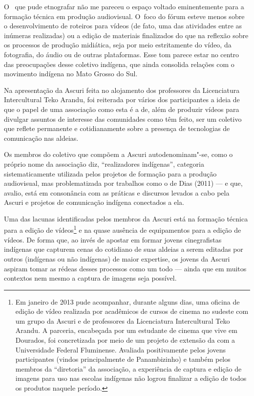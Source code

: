 O~ que pude etnografar não me pareceu o espaço voltado eminentemente
para a formação técnica em produção audiovisual. O~foco do fórum esteve
menos sobre o desenvolvimento de roteiros para vídeos (de fato, uma das
atividades entre as inúmeras realizadas) ou a edição de materiais
finalizados do que na reflexão sobre os processos de produção
midiática, seja por meio estritamente do vídeo, da fotografia, do áudio
ou de outras plataformas. Esse tom parece estar no centro das
preocupações desse coletivo indígena, que ainda consolida relações com
o movimento indígena no Mato Grosso do Sul.

Na apresentação da Ascuri feita no alojamento dos professores da
Licenciatura Intercultural Teko Arandu, foi reiterada por vários dos
participantes a ideia de que o papel de uma associação como esta é a
de, além de produzir vídeos para divulgar assuntos de interesse das
comunidades como têm feito, ser um coletivo que reflete permanente e cotidianamente
sobre a presença de tecnologias de comunicação nas aldeias.

Os membros do coletivo que compõem a Ascuri autodenominam"-se, como o
próprio nome da associação diz, ``realizadores indígenas'', categoria
sistematicamente utilizada pelos projetos de formação para a produção
audiovisual, mas problematizada por trabalhos como o de Dias (2011) --- e
que, avalio, está em consonância com as práticas e discursos levados a
cabo pela Ascuri e projetos de comunicação indígena conectados a ela.

Uma das lacunas identificadas pelos membros da Ascuri está na formação
técnica para a edição de vídeos\footnote{Em janeiro de 2013 pude
acompanhar, durante alguns dias, uma oficina de edição de vídeo
realizada por acadêmicos de cursos de cinema no sudeste com um grupo da
Ascuri e de professores da Licenciatura Intercultural Teko Arandu. A
parceria, encabeçada por um estudante de cinema que vive em Dourados,
foi concretizada por meio de um projeto de extensão da  com a
Universidade Federal Fluminense. Avaliada positivamente pelos jovens
participantes (vindos principalmente de Panambizinho) e também pelos
membros da ``diretoria'' da associação, a experiência de captura e edição
de imagens para uso nas escolas indígenas não logrou finalizar a edição
de todos os produtos naquele período. } e na quase ausência de
equipamentos para a edição de vídeos. De forma que, ao invés de apostar
em formar jovens cinegrafistas indígenas que capturem cenas do
cotidiano de suas aldeias a serem editadas por outros (indígenas ou não
indígenas) de maior expertise, os jovens da Ascuri aspiram tomar as
rédeas desses processos como um todo --- ainda que em muitos contextos
nem mesmo a captura de imagens seja possível.

